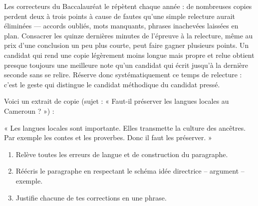 \documentclass[11pt]{article}
\begin{document}
\begin{savaistu}
Les correcteurs du Baccalauréat le répètent chaque année : de nombreuses copies perdent deux à trois points à cause de fautes qu'une simple relecture aurait éliminées — accords oubliés, mots manquants, phrases inachevées laissées en plan. Consacrer les quinze dernières minutes de l'épreuve à la relecture, même au prix d'une conclusion un peu plus courte, peut faire gagner plusieurs points. Un candidat qui rend une copie légèrement moins longue mais propre et relue obtient presque toujours une meilleure note qu'un candidat qui écrit jusqu'à la dernière seconde sans se relire. Réserve donc systématiquement ce temps de relecture : c'est le geste qui distingue le candidat méthodique du candidat pressé.
\end{savaistu}

\begin{exercice}
Voici un extrait de copie (sujet : « Faut-il préserver les langues locales au Cameroun ? ») :

« Les langues locales sont importante. Elles transmette la culture des ancêtres. Par exemple les contes et les proverbes. Donc il faut les préserver. »

\begin{enumerate}
\item Relève toutes les erreurs de langue et de construction du paragraphe.
\item Réécris le paragraphe en respectant le schéma idée directrice -- argument -- exemple.
\item Justifie chacune de tes corrections en une phrase.
\end{enumerate}
\end{exercice}
\end{document}
